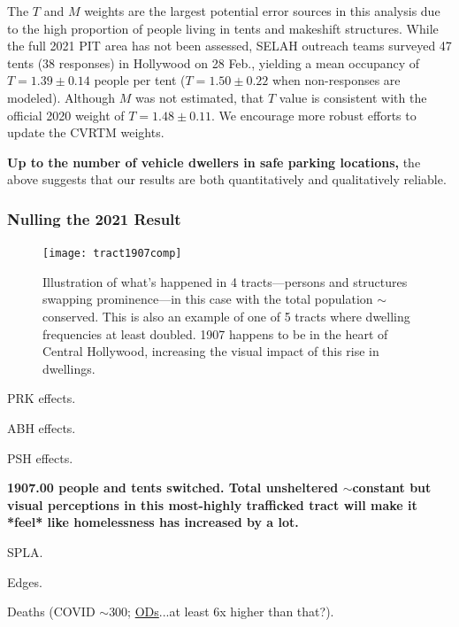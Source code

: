 \documentclass[11pt,twocolumn]{article}
\def\bfr{\bf\color{red}}
\begin{document}
The $T$ and $M$ weights are the largest 
potential error sources in this analysis due to the high proportion of people living in tents and makeshift structures. 
While the full 2021 PIT area has not been assessed, SELAH outreach teams surveyed 47 tents (38 responses) in 
Hollywood on 28 Feb., yielding a mean occupancy of $T=1.39\pm0.14$ people per tent ($T=1.50\pm0.22$ when 
non-responses are modeled). Although $M$ was not estimated, that $T$ value is consistent with the official 2020 
weight of $T=1.48\pm0.11$. We encourage more robust efforts to update the CVRTM weights.

{\bfr Up to the number of vehicle dwellers in safe parking locations,} the above suggests that our results 
are both quantitatively and qualitatively reliable.\\

\subsubsection{Nulling the 2021 Result}
\label{sec:nullOut}

\begin{figure}[]
	\centering
	\texttt{[image: tract1907comp]}
	\caption{Illustration of what's happened in 4 tracts---persons and structures
			swapping prominence---in this case with the total population
			$\sim$conserved. This is also an example of one of 5 tracts where
			dwelling frequencies at least doubled. 1907 happens to be in the 
			heart of Central Hollywood, increasing the visual impact of this
			rise in dwellings.}
	\label{fig:1907}
\end{figure}

PRK effects.

ABH effects.

PSH effects.

{\bfr 1907.00 people and tents switched. Total unsheltered $\sim$constant but visual perceptions
in this most-highly trafficked tract will make it *feel* like homelessness has increased by a lot.}

SPLA.

Edges.

Deaths (COVID $\sim$300; \href{http://publichealth.lacounty.gov/phcommon/public/media/mediapubhpdetail.cfm?prid=2900#:~:text=LOS\%20ANGELES\%20\%E2\%80\%93The\%20Los\%20Angeles,deaths\%20among\%20people\%20experiencing\%20homelessness.}{ODs}...at least 6x higher
than that?).
\end{document}
